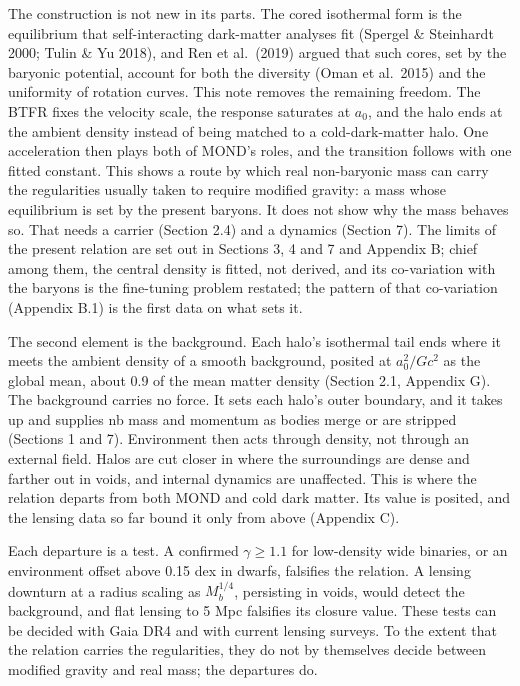 \documentclass[
  10pt,
]{article}
\begin{document}
The construction is not new in its parts. The cored isothermal form is the equilibrium that self-interacting dark-matter analyses fit (Spergel \& Steinhardt 2000; Tulin \& Yu 2018), and Ren et al.~(2019) argued that such cores, set by the baryonic potential, account for both the diversity (Oman et al.~2015) and the uniformity of rotation curves. This note removes the remaining freedom. The BTFR fixes the velocity scale, the response saturates at $a_0$, and the halo ends at the ambient density instead of being matched to a cold-dark-matter halo. One acceleration then plays both of MOND's roles, and the transition follows with one fitted constant. This shows a route by which real non-baryonic mass can carry the regularities usually taken to require modified gravity: a mass whose equilibrium is set by the present baryons. It does not show why the mass behaves so. That needs a carrier (Section 2.4) and a dynamics (Section 7). The limits of the present relation are set out in Sections 3, 4 and 7 and Appendix B; chief among them, the central density is fitted, not derived, and its co-variation with the baryons is the fine-tuning problem restated; the pattern of that co-variation (Appendix B.1) is the first data on what sets it.

The second element is the background. Each halo's isothermal tail ends where it meets the ambient density of a smooth background, posited at $a_0^2/Gc^2$ as the global mean, about 0.9 of the mean matter density (Section 2.1, Appendix G). The background carries no force. It sets each halo's outer boundary, and it takes up and supplies nb mass and momentum as bodies merge or are stripped (Sections 1 and 7). Environment then acts through density, not through an external field. Halos are cut closer in where the surroundings are dense and farther out in voids, and internal dynamics are unaffected. This is where the relation departs from both MOND and cold dark matter. Its value is posited, and the lensing data so far bound it only from above (Appendix C).

Each departure is a test. A confirmed $\gamma\ge1.1$ for low-density wide binaries, or an environment offset above 0.15 dex in dwarfs, falsifies the relation. A lensing downturn at a radius scaling as $M_b^{1/4}$, persisting in voids, would detect the background, and flat lensing to 5 Mpc falsifies its closure value. These tests can be decided with Gaia DR4 and with current lensing surveys. To the extent that the relation carries the regularities, they do not by themselves decide between modified gravity and real mass; the departures do.
\end{document}

